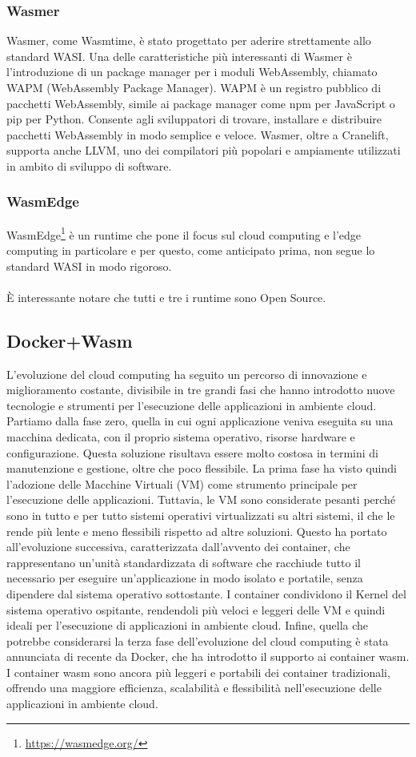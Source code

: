 \subsubsection{Wasmer}
Wasmer, come Wasmtime, è stato progettato per aderire strettamente allo standard WASI. Una delle caratteristiche più
interessanti di Wasmer è l'introduzione di un package manager per i moduli WebAssembly, chiamato WAPM (WebAssembly
Package Manager). WAPM è un registro pubblico di pacchetti WebAssembly, simile ai package manager come npm per
JavaScript o pip per Python. Consente agli sviluppatori di trovare, installare e distribuire pacchetti WebAssembly in
modo semplice e veloce. Wasmer, oltre a Cranelift, supporta anche LLVM, uno dei compilatori più popolari e ampiamente
utilizzati in ambito di sviluppo di software.

\subsubsection{WasmEdge}
WasmEdge\footnote{\url{https://wasmedge.org/}} è un runtime che pone il focus sul cloud computing e l'edge computing in
particolare e per questo, come anticipato prima, non segue lo standard WASI in modo rigoroso. \\
\\
È interessante notare che tutti e tre i runtime sono Open Source.
\subsection{Docker+Wasm}
L'evoluzione del cloud computing ha seguito un percorso di innovazione e miglioramento costante, divisibile in tre
grandi fasi che hanno introdotto nuove tecnologie e strumenti per l'esecuzione delle applicazioni in ambiente cloud.
Partiamo dalla fase zero, quella in cui ogni applicazione veniva eseguita su una macchina dedicata, con il proprio
sistema operativo, risorse hardware e configurazione. Questa soluzione risultava essere molto costosa in termini di
manutenzione e gestione, oltre che poco flessibile. La prima fase ha visto quindi l'adozione delle Macchine Virtuali
(VM) come strumento principale per l'esecuzione delle applicazioni. Tuttavia, le VM sono considerate pesanti perché sono
in tutto e per tutto sistemi operativi virtualizzati su altri sistemi, il che le rende più lente e meno flessibili
rispetto ad altre soluzioni. Questo ha portato all'evoluzione successiva, caratterizzata dall'avvento dei container, che
rappresentano un'unità standardizzata di software che racchiude tutto il necessario per eseguire un'applicazione in modo
isolato e portatile, senza dipendere dal sistema operativo sottostante. I container condividono il Kernel del sistema
operativo ospitante, rendendoli più veloci e leggeri delle VM e quindi ideali per l'esecuzione di applicazioni in
ambiente cloud. Infine, quella che potrebbe considerarsi la terza fase dell'evoluzione del cloud computing è stata
annunciata di recente da Docker, che ha introdotto il supporto ai container wasm\cite{docker-wasm-tech-preview}. I
container wasm sono ancora più leggeri e portabili dei container tradizionali, offrendo una maggiore efficienza,
scalabilità e flessibilità nell'esecuzione delle applicazioni in ambiente cloud.

